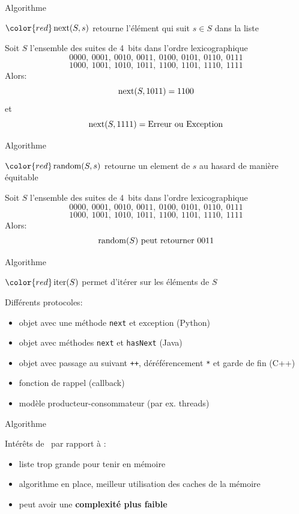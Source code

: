 \documentclass{beamer}
\def\red{\color{red}}
\begin{document}
\begin{frame}{Algorithme \Next}
\begin{ALGO}[{{\red\Next}}]
${\red\Next(S, s)}$ retourne l'élément qui suit $s \in S$ dans la liste
\end{ALGO}
\medskip\pause
Soit $S$ l'ensemble des suites de 4~bits dans l'ordre lexicographique
\[ 0000,\ 0001,\ 0010,\ 0011,\ 0100,\ 0101,\ 0110,\ 0111 \]
\[ 1000,\ 1001,\ 1010,\ 1011,\ 1100,\ 1101,\ 1110,\ 1111 \]
\medskip\pause
Alors:
$$\operatorname{next}(S, 1011) = 1100$$
\medskip\pause
et
$$\operatorname{next}(S, 1111) = \text{Erreur ou Exception}$$
\end{frame}

\begin{frame}{Algorithme \Random}
\begin{ALGO}[{{\red\Random}}]
${\red\Random(S, s)}$ retourne un element de $s$ au hasard de manière équitable
\end{ALGO}
\medskip\pause
Soit $S$ l'ensemble des suites de 4~bits dans l'ordre lexicographique
\[ 0000,\ 0001,\ 0010,\ 0011,\ 0100,\ 0101,\ 0110,\ 0111 \]
\[ 1000,\ 1001,\ 1010,\ 1011,\ 1100,\ 1101,\ 1110,\ 1111 \]
\medskip\pause
Alors:
$$\operatorname{random}(S)\text{ peut retourner }0011$$
\end{frame}


\begin{frame}{Algorithme \Iter}
\begin{ALGO}[{{\red\Iter}}]
${\red\Iter(S)}$ permet d'itérer sur les éléments de $S$
\end{ALGO}
\medskip\pause

Différents protocoles:
\begin{itemize}
\item objet avec une méthode \texttt{next} et exception (Python)
\item objet avec méthodes \texttt{next} et \texttt{hasNext} (Java)
\item objet avec passage au suivant \texttt{++}, déréférencement
  \texttt{*} et garde de fin (C++)
\item fonction de rappel (callback)
\item modèle producteur-consommateur (par ex. threads)
\end{itemize}
\end{frame}

\begin{frame}{Algorithme \Iter}
  \begin{NOTE}
    Intérêts de \Iter\ par rapport à \List:
    \begin{itemize}
      \pause
    \item liste trop grande pour tenir en mémoire
      \pause
    \item algorithme en place, meilleur utilisation des caches de la mémoire
      \pause
    \item peut avoir une \textbf{complexité plus faible}
    \end{itemize}
  \end{NOTE}
\end{frame}
\end{document}
